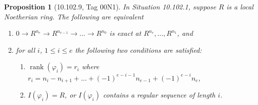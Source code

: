 \documentclass[UTF8,11pt]{ctexart}
\newtheorem*{proposition}{Proposition}
\begin{document}
\begin{proposition}[10.102.9, Tag 00N1]
In Situation 10.102.1, suppose $R$ is a local Noetherian ring. The following are equivalent
\begin{enumerate}
\item $0\to R^{n_e}\to R^{n_{e-1}}\to\ldots\to R^{n_0}$ is exact at $R^{n_e},\ldots,R^{n_1}$, and
\item for all $i$, $1\leq i\leq e$ the following two conditions are satisfied:
\begin{enumerate}[label=(\alph*)]
\item $\operatorname{rank}(\varphi_i)=r_i$ where $r_i=n_i-n_{i+1}+\ldots+(-1)^{e-i-1}n_{e-1}+(-1)^{e-i}n_e$,
\item $I(\varphi_i)=R$, or $I(\varphi_i)$ contains a regular sequence of length $i$.
\end{enumerate}
\end{enumerate}
\end{proposition}
\end{document}
